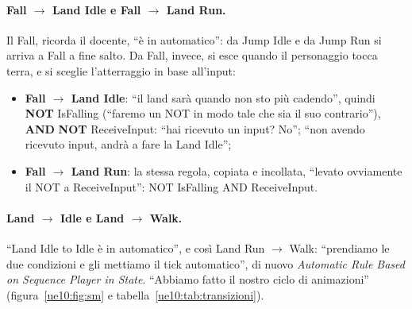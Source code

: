 \paragraph{Fall $\rightarrow$ Land Idle e Fall $\rightarrow$ Land Run.} Il Fall, ricorda
il docente, ``è in automatico'': da Jump Idle e da Jump Run si arriva a Fall a fine
salto. Da Fall, invece, si esce quando il personaggio tocca terra, e si sceglie
l'atterraggio in base all'input:
\begin{itemize}
  \item \textbf{Fall $\rightarrow$ Land Idle}: ``il land sarà quando non sto più cadendo'',
        quindi \textbf{NOT} IsFalling (``faremo un NOT in modo tale che sia il suo
        contrario''), \textbf{AND} \textbf{NOT} ReceiveInput: ``hai ricevuto un input? No'';
        ``non avendo ricevuto input, andrà a fare la Land Idle'';
  \item \textbf{Fall $\rightarrow$ Land Run}: la stessa regola, copiata e incollata,
        ``levato ovviamente il NOT a ReceiveInput'': NOT IsFalling AND ReceiveInput.
\end{itemize}

\paragraph{Land $\rightarrow$ Idle e Land $\rightarrow$ Walk.} ``Land Idle to Idle è in
automatico'', e così Land Run $\rightarrow$ Walk: ``prendiamo le due condizioni e gli
mettiamo il tick automatico'', di nuovo \emph{Automatic Rule Based on Sequence Player in
State}. ``Abbiamo fatto il nostro ciclo di animazioni'' (figura~\ref{ue10:fig:sm} e
tabella~\ref{ue10:tab:transizioni}).


